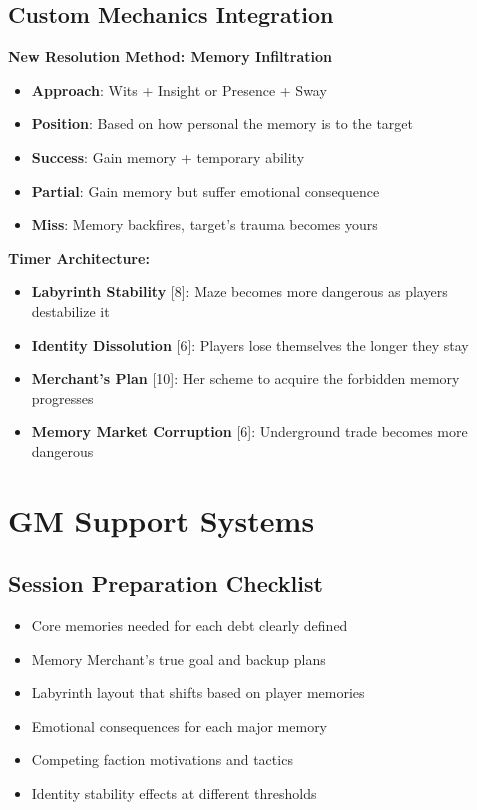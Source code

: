 \documentclass[11pt]{article}
\begin{document}
\subsection*{Custom Mechanics Integration}

\textbf{New Resolution Method: Memory Infiltration}
\begin{itemize}[leftmargin=*]
  \item \textbf{Approach}: Wits + Insight or Presence + Sway
  \item \textbf{Position}: Based on how personal the memory is to the target
  \item \textbf{Success}: Gain memory + temporary ability
  \item \textbf{Partial}: Gain memory but suffer emotional consequence
  \item \textbf{Miss}: Memory backfires, target's trauma becomes yours
\end{itemize}

\textbf{Timer Architecture:}
\begin{itemize}[leftmargin=*]
  \item \textbf{Labyrinth Stability} [8]: Maze becomes more dangerous as players destabilize it
  \item \textbf{Identity Dissolution} [6]: Players lose themselves the longer they stay
  \item \textbf{Merchant's Plan} [10]: Her scheme to acquire the forbidden memory progresses
  \item \textbf{Memory Market Corruption} [6]: Underground trade becomes more dangerous
\end{itemize}

\section*{GM Support Systems}

\subsection*{Session Preparation Checklist}
\begin{itemize}[leftmargin=*]
  \item [ ] Core memories needed for each debt clearly defined
  \item [ ] Memory Merchant's true goal and backup plans
  \item [ ] Labyrinth layout that shifts based on player memories
  \item [ ] Emotional consequences for each major memory
  \item [ ] Competing faction motivations and tactics
  \item [ ] Identity stability effects at different thresholds
\end{itemize}
\end{document}

